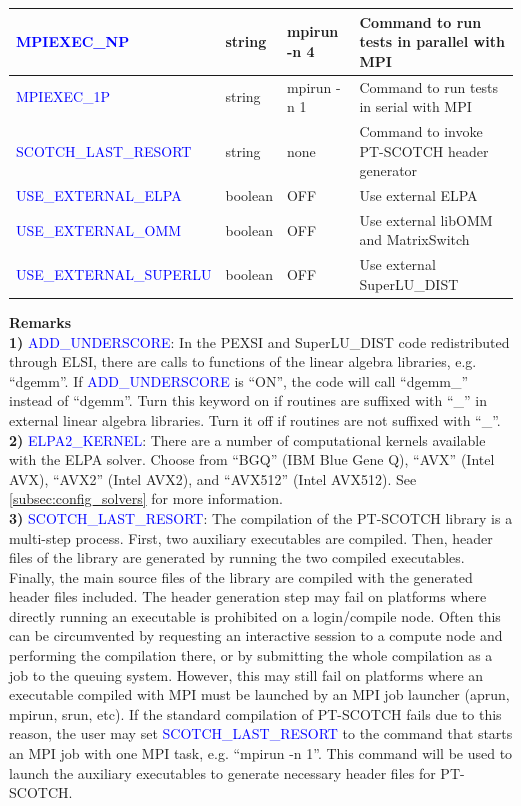 \documentclass{report}
\begin{document}
\begin{tabular}[]{|p{50mm}|p{15mm}|p{20mm}|p{80mm}|}
\hline
\textcolor{blue}{MPIEXEC\_NP}                & string  & mpirun -n 4 & Command to run tests in parallel with MPI\\
\hline
\textcolor{blue}{MPIEXEC\_1P}                & string  & mpirun -n 1 & Command to run tests in serial with MPI\\
\hline
\textcolor{blue}{SCOTCH\_LAST\_RESORT}       & string  & none        & Command to invoke PT-SCOTCH header generator\\
\hline
\textcolor{blue}{USE\_EXTERNAL\_ELPA}        & boolean & OFF         & Use external ELPA\\
\hline
\textcolor{blue}{USE\_EXTERNAL\_OMM}         & boolean & OFF         & Use external libOMM and MatrixSwitch\\
\hline
\textcolor{blue}{USE\_EXTERNAL\_SUPERLU}     & boolean & OFF         & Use external SuperLU\_DIST\\
\hline
\end{tabular}

\bigskip
\textbf{Remarks}\\

\textbf{1)} \textcolor{blue}{ADD\_UNDERSCORE}:  In the PEXSI and SuperLU\_DIST code redistributed through ELSI, there are calls to functions of the linear algebra libraries, e.g. ``dgemm''.  If \textcolor{blue}{ADD\_UNDERSCORE} is ``ON'', the code will call ``dgemm\_'' instead of ``dgemm''.  Turn this keyword on if routines are suffixed with ``\_'' in external linear algebra libraries.  Turn it off if routines are not suffixed with ``\_''.\\

\textbf{2)} \textcolor{blue}{ELPA2\_KERNEL}:  There are a number of computational kernels available with the ELPA solver.  Choose from ``BGQ'' (IBM Blue Gene Q), ``AVX'' (Intel AVX), ``AVX2'' (Intel AVX2), and ``AVX512'' (Intel AVX512).  See \ref{subsec:config_solvers} for more information.\\

\textbf{3)} \textcolor{blue}{SCOTCH\_LAST\_RESORT}:  The compilation of the PT-SCOTCH library is a multi-step process.  First, two auxiliary executables are compiled.  Then, header files of the library are generated by running the two compiled executables.  Finally, the main source files of the library are compiled with the generated header files included.  The header generation step may fail on platforms where directly running an executable is prohibited on a login/compile node.  Often this can be circumvented by requesting an interactive session to a compute node and performing the compilation there, or by submitting the whole compilation as a job to the queuing system.  However, this may still fail on platforms where an executable compiled with MPI must be launched by an MPI job launcher (aprun, mpirun, srun, etc).  If the standard compilation of PT-SCOTCH fails due to this reason, the user may set \textcolor{blue}{SCOTCH\_LAST\_RESORT} to the command that starts an MPI job with one MPI task, e.g. ``mpirun -n 1''.  This command will be used to launch the auxiliary executables to generate necessary header files for PT-SCOTCH.\\
\end{document}
